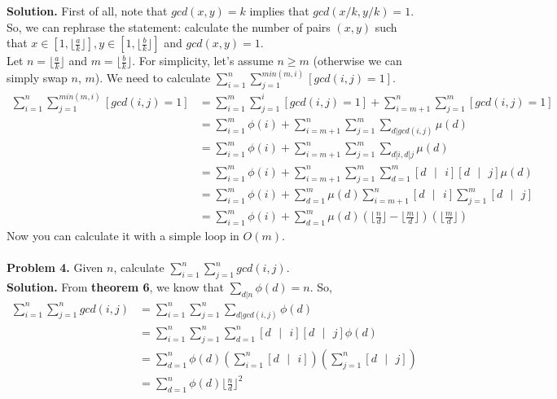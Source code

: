 \documentclass[11pt]{article}
\begin{document}
\textbf{Solution.} First of all, note that $gcd(x, y) = k$ implies that $gcd(x/k, y/k) = 1$. So, we can rephrase the statement: calculate the number of pairs $(x, y)$ such that $x \in [1, \lfloor \frac{a}{k} \rfloor], y \in [1, \lfloor \frac{b}{k} \rfloor]$ and $gcd(x, y) = 1$.\\
Let $n = \lfloor \frac{a}{k} \rfloor$ and $m = \lfloor \frac{b}{k} \rfloor$. For simplicity, let's assume $n \geq m$ (otherwise we can simply swap $n$, $m$). We need to calculate $\sum_{i = 1}^{n} \sum_{j = 1}^{min(m, i)} [gcd(i, j) = 1]$.\\
\begin{align*}
  \sum_{i = 1}^{n} \sum_{j = 1}^{min(m, i)} [gcd(i, j) = 1] &= \sum_{i = 1}^{m} \sum_{j = 1}^{i} [gcd(i, j) = 1] + \sum_{i = m + 1}^{n} \sum_{j = 1}^{m} [gcd(i, j) = 1] \\
                                                                &= \sum_{i = 1}^{m} \phi(i) + \sum_{i = m + 1}^{n} \sum_{j = 1}^{m} \sum_{d | gcd(i, j)} \mu(d) \\
                                                                &= \sum_{i = 1}^{m} \phi(i) + \sum_{i = m + 1}^{n} \sum_{j = 1}^{m} \sum_{d | i, d | j} \mu(d) \\
                                                                &= \sum_{i = 1}^{m} \phi(i) + \sum_{i = m + 1}^{n} \sum_{j = 1}^{m} \sum_{d = 1}^{m} [d \text{ }| \text{ } i] [d \text{ }| \text{ }j] \mu(d) \\
                                                                &= \sum_{i = 1}^{m} \phi(i) + \sum_{d = 1}^{m} \mu(d) \sum_{i = m + 1}^{n} [d \text{ }| \text{ } i] \sum_{j = 1}^{m} [d \text{ }| \text{ }j] \\
                                                                &= \sum_{i = 1}^{m} \phi(i) + \sum_{d = 1}^{m} \mu(d) (\lfloor \frac{n}{d} \rfloor - \lfloor \frac{m}{d} \rfloor) (\lfloor \frac{m}{d} \rfloor)
\end{align*}
Now you can calculate it with a simple loop in $O(m)$.\\ \\
\textbf{Problem 4.} Given $n$, calculate $\sum_{i = 1}^{n} \sum_{j = 1}^{n} gcd(i, j)$.\\
\textbf{Solution.} From \textbf{theorem 6}, we know that $\sum_{d|n} \phi(d) = n$. So,
\begin{align*}
  \sum_{i = 1}^{n} \sum_{j = 1}^{n} gcd(i, j) &= \sum_{i = 1}^{n} \sum_{j = 1}^{n} \sum_{d | gcd(i, j)} \phi(d) \\
                                              &= \sum_{i = 1}^{n} \sum_{j = 1}^{n} \sum_{d = 1}^{n} [d \text{ }| \text{ } i] [d \text{ }| \text{ }j]\phi(d) \\
                                              &= \sum_{d = 1}^{n} \phi(d) (\sum_{i = 1}^{n} [d \text{ }| \text{ } i]) (\sum_{j = 1}^{n} [d \text{ }| \text{ } j]) \\
                                              &= \sum_{d = 1}^{n} \phi(d) {\lfloor \frac{n}{d} \rfloor}^2
\end{align*}
\end{document}
